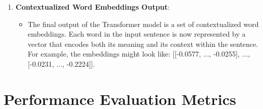\begin{enumerate}
    \item \textbf{Contextualized Word Embeddings Output}:
    \begin{itemize}
        \item The final output of the Transformer model is a set of contextualized word embeddings. Each word in the input sentence is now represented by a vector that encodes both its meaning and its context within the sentence. For example, the embeddings might look like:
        [[-0.0577, ..., -0.0255],
         ...,
         [-0.0231, ..., -0.2224]].
    \end{itemize}
\end{enumerate}

\section{Performance Evaluation Metrics}

